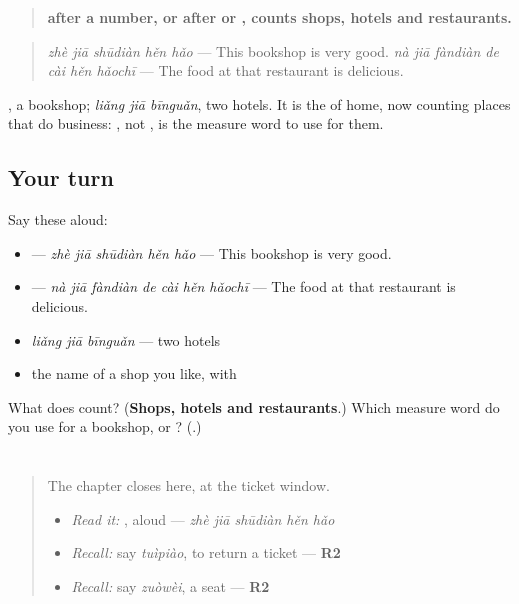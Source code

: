 \begin{grammarlens}[title={Grammar Lens: \zh{家} for counting shops}]
\begin{quote}
\textbf{ after a number, or after  or , counts shops, hotels and restaurants.}
\end{quote}

\begin{quote}
\textbf{} \emph{zhè jiā shūdiàn hěn hǎo} — This bookshop is very good. \textbf{} \emph{nà jiā fàndiàn de cài hěn hǎochī} — The food at that restaurant is delicious.
\end{quote}

, a bookshop; \emph{liǎng jiā bīnguǎn}, two hotels. It is the  of home, now counting places that do business: , not , is the measure word to use for them.
\end{grammarlens}

\subsection*{Your turn}
Say these aloud:

\begin{itemize}
\raggedright
  \item {} — \emph{zhè jiā shūdiàn hěn hǎo} — This bookshop is very good.
  \item {} — \emph{nà jiā fàndiàn de cài hěn hǎochī} — The food at that restaurant is delicious.
  \item \emph{liǎng jiā bīnguǎn} — two hotels
  \item the name of a shop you like, with 
\end{itemize}

\begin{tcolorbox}[breakable,colback=teal!4,colframe=teal!35!black,title={Before you move on}]
What does  count? (\textbf{Shops, hotels and restaurants}.) Which measure word do you use for a bookshop,  or ? (\textbf{}.)
\end{tcolorbox}
\section[Practice]{}

\label{lesson:ZH-C284-practice}



\begin{quote}
The chapter closes here, at the ticket window.

\begin{itemize}
\raggedright
  \item \emph{Read it:} , aloud — \emph{zhè jiā shūdiàn hěn hǎo}
  \item \emph{Recall:} say \emph{tuìpiào}, to return a ticket — \textbf{R2}
  \item \emph{Recall:} say \emph{zuòwèi}, a seat — \textbf{R2}
\end{itemize}
\end{quote}


